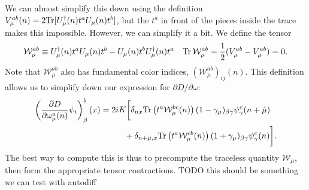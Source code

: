 We can almost simplify this down using the definition $V_\mu^{ab}(n) = 2\mathrm{Tr} [U_\mu^\dagger(n) t^a U_\mu(n) t^b]$, but the $t^a$ in front of the pieces inside the trace makes this impossible. However, we can simplify it a bit. We define the tensor
\begin{align}
	\mathcal W_\mu^{ab}\equiv U_\mu^\dagger(n) t^a U_\mu(n) t^b - U_\mu(n) t^b U_\mu^\dagger(n) t^a && \mathrm{Tr}\,\mathcal W_\mu^{ab} = \frac{1}{2}(V_\mu^{ab} - V_\mu^{ab}) = 0.
\end{align}
Note that $\mathcal W_\mu^{ab}$ also has fundamental color indices, $(\mathcal W_\mu^{ab})_{ij}(n)$. This definition allows us to simplify down our expression for $\partial D / \partial\omega$:
\begin{align}\begin{split}
	\left( \frac{\partial D}{\partial\omega_\mu^a(n)} \psi_i \right)_\beta^b(x)
	&= 2 i K \bigg[ \delta_{nx} \mathrm{Tr} \left( t^a \mathcal W_\mu^{bc}(n) \right) (1 - \gamma_\mu)_{\beta\gamma} \psi_\gamma^c(n + \hat\mu) \\
	&\hspace{1cm}+ \delta_{n + \hat\mu, x} \mathrm{Tr}\left( t^a \mathcal W_\mu^{cb}(n) \right) (1 + \gamma_\mu)_{\beta\gamma} \psi_\gamma^c(n) \bigg].
\end{split}\end{align}
The best way to compute this is thus to precompute the traceless quantity $\mathcal W_\mu$, then form the appropriate tensor contractions. {\color{red}TODO this should be something we can test with autodiff}

